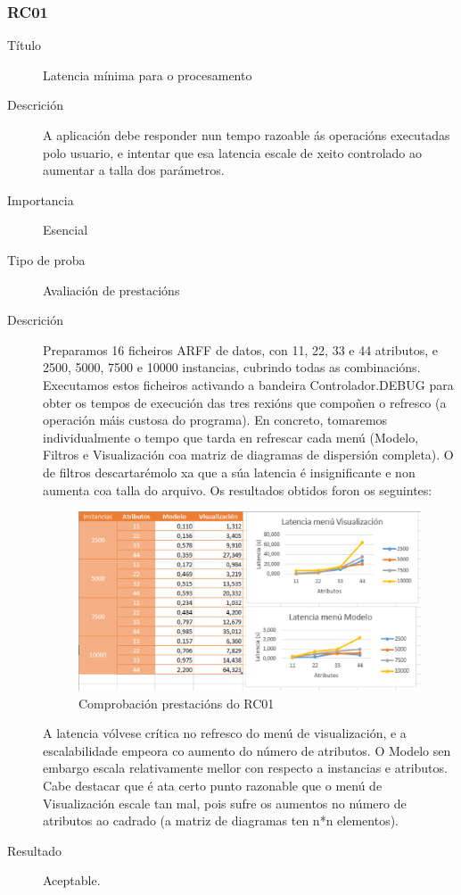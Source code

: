 \subsubsection*{RC01}
\begin{description}
\item[Título] \hfill
Latencia mínima para o procesamento
\item[Descrición] \hfill
A aplicación debe responder nun tempo razoable ás operacións executadas polo usuario, e intentar que esa latencia escale de xeito controlado ao aumentar a talla dos parámetros.
\item[Importancia] \hfill
Esencial
\item[Tipo de proba] \hfill
Avaliación de prestacións
\item[Descrición]
Preparamos 16 ficheiros ARFF de datos, con 11, 22, 33 e 44 atributos, e 2500, 5000, 7500 e 10000 instancias, cubrindo todas as combinacións. Executamos estos ficheiros activando a bandeira Controlador.DEBUG para obter os tempos de execución das tres rexións que compoñen o refresco (a operación máis custosa do programa). En concreto, tomaremos individualmente o tempo que tarda en refrescar cada menú (Modelo, Filtros e Visualización coa matriz de diagramas de dispersión completa). O de filtros descartarémolo xa que a súa latencia é insignificante e non aumenta coa talla do arquivo. Os resultados obtidos foron os seguintes:
\begin{figure}
\centering
\includegraphics[width=\textwidth,height=\textheight,keepaspectratio]{figuras/eficiencia}
\caption{Comprobación prestacións do RC01}
\label{eficiencia}
\end{figure}
A latencia vólvese crítica no refresco do menú de visualización, e a escalabilidade empeora co aumento do número de atributos. O Modelo sen embargo escala relativamente mellor con respecto a instancias e atributos. Cabe destacar que é ata certo punto razonable que o menú de Visualización escale tan mal, pois sufre os aumentos no número de atributos ao cadrado (a matriz de diagramas ten n*n elementos).
\item[Resultado]
Aceptable.
\end{description}

